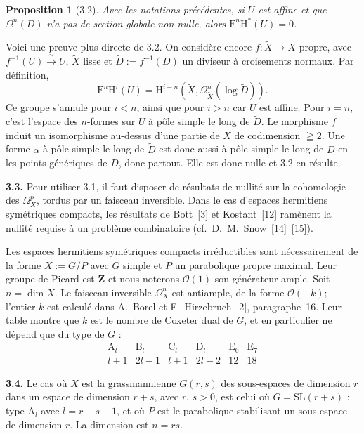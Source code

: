 \documentclass[12pt,a4paper]{article}
\theoremstyle{plain}
\newtheorem{proposition}[theorem]{Proposition}
\theoremstyle{definition}
\begin{document}
\begin{proposition}[3.2]
Avec les notations précédentes, si $U$ est affine et que $\Omega^n(D)$ n'a pas de section globale non nulle, alors $\mathrm{F}^n \mathrm{H}^*(U) = 0$.
\end{proposition}

Voici une preuve plus directe de 3.2. On considère encore $f : \tilde{X} \to X$ propre, avec $f^{-1}(U) \xrightarrow{\;\sim\;} U$, $\tilde{X}$ lisse et $\tilde{D} := f^{-1}(D)$ un diviseur à croisements normaux. Par définition,
\[
\mathrm{F}^n \mathrm{H}^i(U) = \mathrm{H}^{i-n}(\tilde{X}, \Omega_{\tilde{X}}^n(\log \tilde{D})).
\]
Ce groupe s'annule pour $i < n$, ainsi que pour $i > n$ car $U$ est affine. Pour $i = n$, c'est l'espace des $n$-formes sur $U$ à pôle simple le long de $\tilde{D}$. Le morphisme $f$ induit un isomorphisme au-dessus d'une partie de $X$ de codimension $\geqq 2$. Une forme $\alpha$ à pôle simple le long de $\tilde{D}$ est donc aussi à pôle simple le long de $D$ en les points génériques de $D$, donc partout. Elle est donc nulle et 3.2 en résulte.

\medskip
\textbf{3.3.} Pour utiliser 3.1, il faut disposer de résultats de nullité sur la cohomologie des $\Omega_X^p$, tordus par un faisceau inversible. Dans le cas d'espaces hermitiens symétriques compacts, les résultats de Bott~[3] et Kostant~[12] ramènent la nullité requise à un problème combinatoire (cf.\ D.\ M.\ Snow~[14]~[15]).

Les espaces hermitiens symétriques compacts irréductibles sont nécessairement de la forme $X := G/P$ avec $G$ simple et $P$ un parabolique propre maximal. Leur groupe de Picard est $\mathbf{Z}$ et nous noterons $\mathscr{O}(1)$ son générateur ample. Soit $n = \dim X$. Le faisceau inversible $\Omega_X^n$ est antiample, de la forme $\mathscr{O}(-k)$; l'entier $k$ est calculé dans A.\ Borel et F.\ Hirzebruch~[2], paragraphe~16. Leur table montre que $k$ est le nombre de Coxeter dual de $G$, et en particulier ne dépend que du type de $G$ :
\[
\begin{array}{ccccccc}
\mathrm{A}_l & \mathrm{B}_l & \mathrm{C}_l & \mathrm{D}_l & \mathrm{E}_6 & \mathrm{E}_7 \\
l+1 & 2l-1 & l+1 & 2l-2 & 12 & 18
\end{array}
\]

\textbf{3.4.} Le cas où $X$ est la grassmannienne $G(r, s)$ des sous-espaces de dimension $r$ dans un espace de dimension $r+s$, avec $r$, $s > 0$, est celui où $G = \mathrm{SL}(r+s)$ : type $\mathrm{A}_l$ avec $l = r+s-1$, et où $P$ est le parabolique stabilisant un sous-espace de dimension $r$. La dimension est $n = rs$.
\end{document}
